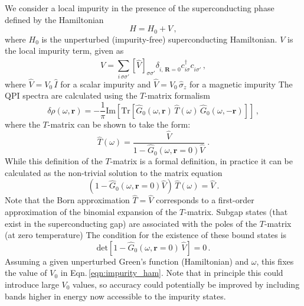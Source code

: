 \documentclass[10pt]{article}
\newcommand{\br}{\boldsymbol{r}}
\begin{document}
We consider a local impurity in the presence of the superconducting phase defined by the Hamiltonian
\begin{equation}
    H = H_0 + V \, ,
\end{equation}
where $H_0$ is the unperturbed (impurity-free) superconducting Hamiltonian. $V$ is the local impurity term, given as
\begin{equation} \label{eqn:impurity_ham}
    V = \sum_{i \, \sigma \sigma'} [ \hat V ]_{\sigma \sigma'}^{\phantom{\dagger}} \delta^{\phantom{\dagger}}_{i, \, \boldsymbol{R} = 0} c^\dagger_{i \sigma} c^{\phantom{\dagger}}_{i \sigma'} \, ,
\end{equation}
where $\hat V = V_0 \, \hat I$ for a scalar impurity and $\hat V = V_0 \, \hat \sigma_z$ for a magnetic impurity%
The QPI spectra are calculated using the $T$-matrix formalism%
\begin{equation} \label{eqn:qpi_rs}
    \delta \rho (\omega, \br) = - \frac{1}{\pi}  \text{Im} [  \text{Tr} [ \hat G_0 (\omega, \br) \, \hat T (\omega) \, \hat G_0 ( \omega, - \br) ] ] \, ,
\end{equation}
where the $T$-matrix can be shown to take the form:
\begin{equation}
    \hat T ( \omega ) = \frac{\hat V}{1- \hat G_0 (\omega, \br = 0) \hat V} \; .
\end{equation}
While this definition of the $T$-matrix is a formal definition, in practice it can be calculated as the non-trivial solution to the matrix equation
\begin{equation}
    (1- \hat G_0 (\omega, \br = 0) \hat V) \, \hat T ( \omega ) = \hat V\ .
\end{equation}
Note that the Born approximation $\hat T = \hat V$ corresponds to a first-order approximation of the binomial expansion of the $T$-matrix.
Subgap states (that exist in the superconducting gap) are associated with the poles of the $T$-matrix (at zero temperature)%
The condition for the existence of these bound states is
\begin{equation} \label{eqn:bound_evals}
    \text{det} [ 1 - \hat G_0 (\omega, \br = 0) \, \hat V ] = 0 \, .
\end{equation}
Assuming a given unperturbed Green's function (Hamiltonian) and $\omega$, this fixes the value of $V_0$ in Eqn.\,\eqref{eqn:impurity_ham}. Note that in principle this could introduce large $V_0$ values, so accuracy could potentially be improved by including bands higher in energy now accessible to the impurity states.
\end{document}
